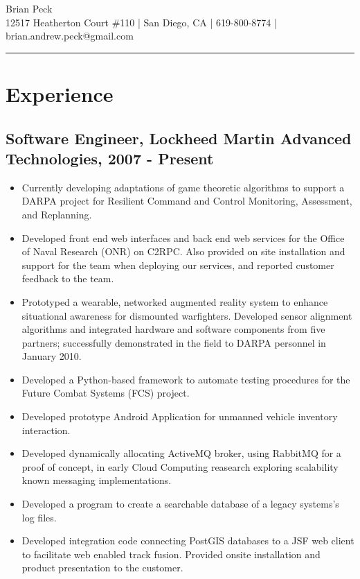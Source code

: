 \documentclass[11pt]{article}
\title{}
\date{}
\begin{document}
\begin{center}
{\huge Brian Peck} \\
12517 Heatherton Court \#110 | San Diego, CA | 619-800-8774 | brian.andrew.peck@gmail.com
\hrule
\end{center}

\section*{Experience}
\label{sec-1}

\subsection*{Software Engineer, Lockheed Martin Advanced Technologies, 2007 - Present}
\label{sec-1.1}

\begin{itemize}
\item Currently developing adaptations of game theoretic algorithms to support a DARPA project for Resilient Command and Control Monitoring, Assessment, and Replanning.
\item Developed front end web interfaces and back end web services for the Office of Naval Research (ONR) on C2RPC. Also provided on site installation and support for the team when deploying our services, and reported customer feedback to the team.
\item Prototyped a wearable, networked augmented reality system to enhance situational awareness for dismounted warfighters.  Developed sensor alignment algorithms and integrated hardware and software components from five partners; successfully demonstrated in the field to DARPA personnel in January 2010.
\item Developed a Python-based framework to automate testing procedures for the Future Combat Systems (FCS) project.
\item Developed prototype Android Application for unmanned vehicle inventory interaction.
\item Developed dynamically allocating ActiveMQ broker, using RabbitMQ for a proof of concept, in early Cloud Computing reasearch exploring scalability known messaging implementations.
\item Developed a program to create a searchable database of a legacy systems's log files.
\item Developed integration code connecting PostGIS databases to a JSF web client to facilitate web enabled track fusion. Provided onsite installation and product presentation to the customer.
\end{itemize}
\end{document}
